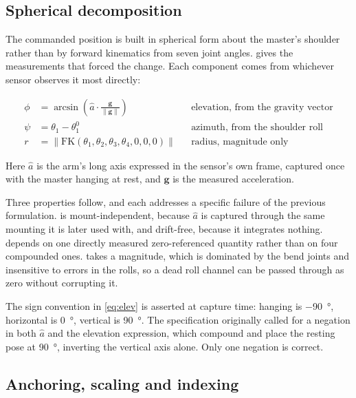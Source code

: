 \subsection{Spherical decomposition}

The commanded position is built in spherical form about the master's shoulder
rather than by forward kinematics from seven joint angles.
 gives the measurements that forced the change. Each
component comes from whichever sensor observes it most directly:

\begin{align}
  \phi &= \arcsin\!\left(\hat{a} \cdot \frac{\mathbf{g}}{\lVert\mathbf{g}\rVert}\right)
    &&\text{elevation, from the gravity vector} \label{eq:elev}\\
  \psi &= \theta_1 - \theta_1^{0}
    &&\text{azimuth, from the shoulder roll} \label{eq:azim}\\
  r &= \bigl\lVert \mathrm{FK}(\theta_1, \theta_2, \theta_3, \theta_4, 0, 0, 0) \bigr\rVert
    &&\text{radius, magnitude only} \label{eq:reach}
\end{align}

Here $\hat{a}$ is the arm's long axis expressed in the sensor's own frame,
captured once with the master hanging at rest, and $\mathbf{g}$ is the
measured acceleration.

Three properties follow, and each addresses a specific failure of the previous
formulation.  is mount-independent, because $\hat{a}$ is
captured through the same mounting it is later used with, and drift-free,
because it integrates nothing.  depends on one directly measured
zero-referenced quantity rather than on four compounded ones.
 takes a magnitude, which is dominated by the bend joints and
insensitive to errors in the rolls, so a dead roll channel can be passed
through as zero without corrupting it.

The sign convention in \cref{eq:elev} is asserted at capture time: hanging is
\SI{-90}{\degree}, horizontal is \SI{0}{\degree}, vertical is
\SI{+90}{\degree}. The specification originally called for a negation in both
$\hat{a}$ and the elevation expression, which compound and place the resting
pose at \SI{+90}{\degree}, inverting the vertical axis alone. Only one
negation is correct.

\subsection{Anchoring, scaling and indexing}

